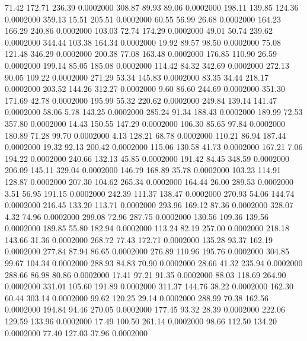   71.42  172.71  236.39   0.0002000
 308.87   89.93   89.06   0.0002000
 198.11  139.85  124.36   0.0002000
 359.13   15.51  205.51   0.0002000
  60.55   56.99   26.68   0.0002000
 164.23  166.29  240.86   0.0002000
 103.03   72.74  174.29   0.0002000
  49.01   50.74  239.62   0.0002000
 344.44  103.38  164.34   0.0002000
  19.92   89.57   98.50   0.0002000
  75.08  121.48  346.29   0.0002000
 200.38   77.08  163.48   0.0002000
 176.85  110.90   26.59   0.0002000
 199.14   85.05  185.08   0.0002000
 114.42   84.32  342.69   0.0002000
 272.13   90.05  109.22   0.0002000
 271.29   53.34  145.83   0.0002000
  83.35   34.44  218.17   0.0002000
 203.52  144.26  312.27   0.0002000
   9.60   86.60  244.69   0.0002000
 351.30  171.69   42.78   0.0002000
 195.99   55.32  220.62   0.0002000
 249.84  139.14  141.47   0.0002000
  58.06    5.78  143.25   0.0002000
 285.24   91.34  188.43   0.0002000
 189.99   72.53  357.80   0.0002000
  14.43  150.55  147.29   0.0002000
 106.30   85.65   97.84   0.0002000
 180.89   71.28   99.70   0.0002000
   4.13  128.21   68.78   0.0002000
 110.21   86.94  187.44   0.0002000
  19.32   92.13  200.42   0.0002000
 115.06  130.58   41.73   0.0002000
 167.21    7.06  194.22   0.0002000
 240.66  132.13   45.85   0.0002000
 191.42   84.45  348.59   0.0002000
 206.09  145.11  329.04   0.0002000
 146.79  168.89   35.78   0.0002000
 103.23  114.91  128.87   0.0002000
 207.30  104.62  265.34   0.0002000
 164.44   26.00  289.53   0.0002000
   3.51   56.95  191.15   0.0002000
 242.39  111.37  138.47   0.0002000
 270.93   54.06  144.74   0.0002000
 216.45  133.20  113.71   0.0002000
 293.96  169.12   87.36   0.0002000
 328.07    4.32   74.96   0.0002000
 299.08   72.96  287.75   0.0002000
 130.56  109.36  139.56   0.0002000
 189.85   55.80  182.94   0.0002000
 113.24   82.19  257.00   0.0002000
 218.18  143.66   31.36   0.0002000
 268.72   77.43  172.71   0.0002000
 135.28   93.37  162.19   0.0002000
 277.84   87.94   86.65   0.0002000
 276.89  110.96  195.76   0.0002000
 304.85   99.67  104.34   0.0002000
 288.93   84.83   70.90   0.0002000
  28.66   41.32  235.94   0.0002000
 288.66   86.98   80.86   0.0002000
  17.41   97.21   91.35   0.0002000
  88.03  118.69  264.90   0.0002000
 331.01  105.60  191.89   0.0002000
 311.37  144.76   38.22   0.0002000
 162.30   60.44  303.14   0.0002000
  99.62  120.25   29.14   0.0002000
 288.99   70.38  162.56   0.0002000
 194.84   94.46  270.05   0.0002000
 177.45   93.32   28.39   0.0002000
 222.06  129.59  133.96   0.0002000
  17.49  100.50  261.14   0.0002000
  98.66  112.50  134.20   0.0002000
  77.40  127.03   37.96   0.0002000
